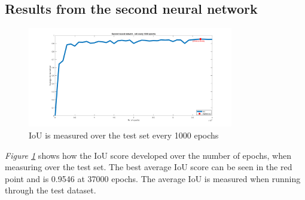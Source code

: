 \clearpage

\subsection{Results from the second neural network}
\begin{figure}[h]
    \centering
    \includegraphics[width=0.8\textwidth, trim={5cm 0 4cm 0},clip]{graphics/results/secondneuralnetworkauto.png}
    \caption{IoU is measured over the test set every 1000 epochs}
    \label{fig:v2neuralnetwork}
\end{figure}
\textit{Figure \ref{fig:v2neuralnetwork}} shows how the IoU score developed over the number of epochs, when measuring over the test set. The best average IoU score can be seen in the red point and is 0.9546 at 37000 epochs. The average IoU is measured when running through the test dataset.

\clearpage
